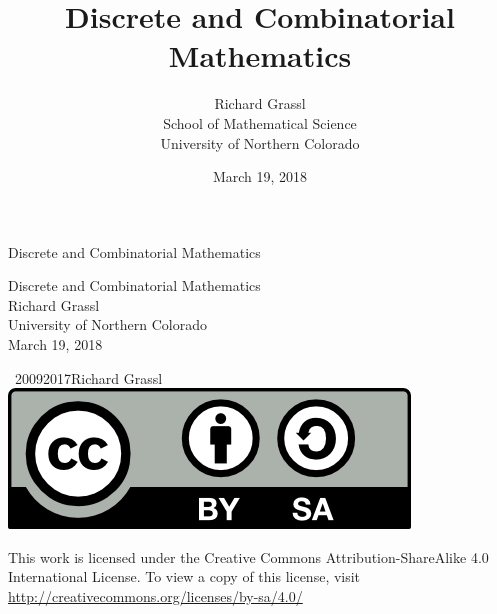 \documentclass[10pt,]{book}
\title{Discrete and Combinatorial Mathematics}
\author{Richard Grassl\\
School of Mathematical Science\\
University of Northern Colorado
}
\date{March 19, 2018}
\theoremstyle{plain}
\theoremstyle{definition}
\theoremstyle{definition}
\numberwithin{equation}{chapter}
\begin{document}
\frontmatter
\thispagestyle{empty}
{\centering
\vspace*{0.28\textheight}
{\Huge Discrete and Combinatorial Mathematics}\\}
\clearpage
\thispagestyle{empty}
\null%
\clearpage
\thispagestyle{empty}
{\centering
\vspace*{0.14\textheight}
{\Huge Discrete and Combinatorial Mathematics}\\[3\baselineskip]
{\Large Richard Grassl}\\[0.5\baselineskip]
{\Large University of Northern Colorado}\\[3\baselineskip]
{\Large March 19, 2018}\\}
\clearpage
\thispagestyle{empty}
\hypertarget{colophon-1}{}
\noindent\textcopyright\ 2009\textendash{}2017\quad{}Richard Grassl\\[0.5\baselineskip]
\hypertarget{p-1}{}%
\includegraphics[width=0.15\linewidth]{../images/by-sa.png}
%
 \par
\hypertarget{p-2}{}%
This work is licensed under the Creative Commons Attribution-ShareAlike 4.0 International License. To view a copy of this license, visit \href{http://creativecommons.org/licenses/by-sa/4.0/}{http://creativecommons.org/licenses/by-sa/4.0/}%
\par\medskip
{}
\null\clearpage
\setcounter{tocdepth}{2}
\renewcommand*\contentsname{Contents}
\tableofcontents
\mainmatter
\typeout{************************************************}
\typeout{************************************************}
\end{document}
